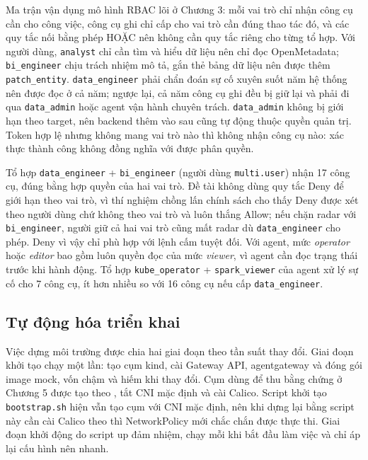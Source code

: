 Ma trận vận dụng mô hình RBAC lõi ở Chương 3: mỗi vai trò chỉ nhận công cụ cần cho công việc, công cụ ghi chỉ cấp cho vai trò cần đúng thao tác đó, và các quy tắc nối bằng phép HOẶC nên không cần quy tắc riêng cho từng tổ hợp. Với người dùng, \texttt{analyst} chỉ cần tìm và hiểu dữ liệu nên chỉ đọc OpenMetadata; \texttt{bi\_engineer} chịu trách nhiệm mô tả, gắn thẻ bảng dữ liệu nên được thêm \texttt{patch\_entity}. \texttt{data\_engineer} phải chẩn đoán sự cố xuyên suốt năm hệ thống nên được đọc ở cả năm; ngược lại, cả năm công cụ ghi đều bị giữ lại và phải đi qua \texttt{data\_admin} hoặc agent vận hành chuyên trách. \texttt{data\_admin} không bị giới hạn theo target, nên backend thêm vào sau cũng tự động thuộc quyền quản trị. Token hợp lệ nhưng không mang vai trò nào thì không nhận công cụ nào: xác thực thành công không đồng nghĩa với được phân quyền.

Tổ hợp \texttt{data\_engineer} + \texttt{bi\_engineer} (người dùng \texttt{multi.user}) nhận 17 công cụ, đúng bằng hợp quyền của hai vai trò. Đề tài không dùng quy tắc Deny để giới hạn theo vai trò, vì thí nghiệm chồng lấn chính sách cho thấy Deny được xét theo người dùng chứ không theo vai trò và luôn thắng Allow; nếu chặn radar với \texttt{bi\_engineer}, người giữ cả hai vai trò cũng mất radar dù \texttt{data\_engineer} cho phép. Deny vì vậy chỉ phù hợp với lệnh cấm tuyệt đối. Với agent, mức \textit{operator} hoặc \textit{editor} bao gồm luôn quyền đọc của mức \textit{viewer}, vì agent cần đọc trạng thái trước khi hành động. Tổ hợp \texttt{kube\_operator} + \texttt{spark\_viewer} của agent xử lý sự cố cho 7 công cụ, ít hơn nhiều so với 16 công cụ nếu cấp \texttt{data\_engineer}.

\subsection{Tự động hóa triển khai}\label{sec:auto}

Việc dựng môi trường được chia hai giai đoạn theo tần suất thay đổi. Giai đoạn khởi tạo chạy một lần: tạo cụm kind, cài Gateway API, agentgateway và đóng gói image mock, vốn chậm và hiếm khi thay đổi. Cụm dùng để thu bằng chứng ở Chương 5 được tạo theo , tắt CNI mặc định và cài Calico. Script khởi tạo \texttt{bootstrap.sh} hiện vẫn tạo cụm với CNI mặc định, nên khi dựng lại bằng script này cần cài Calico theo  thì NetworkPolicy mới chắc chắn được thực thi. Giai đoạn khởi động do script up đảm nhiệm, chạy mỗi khi bắt đầu làm việc và chỉ áp lại cấu hình nên nhanh.


